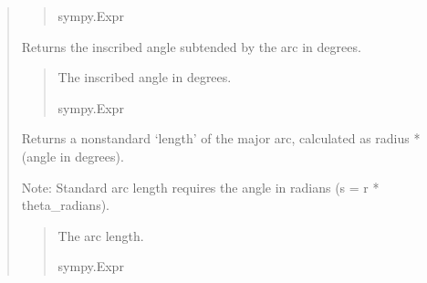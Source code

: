 \documentclass[letterpaper,10pt,english]{sphinxmanual}
\begin{document}
\begin{quote}
\begin{fulllineitems}
\begin{fulllineitems}
\begin{quote}
\begin{description}
\sphinxAtStartPar
sympy.Expr

\end{description}\end{quote}

\end{fulllineitems}


\begin{fulllineitems}
\label{\detokenize{pygeox:pygeox.basic_objects.MajorArc.inscribed_angle}}
\pysigstartsignatures
\pysigline
{}
\pysigstopsignatures
\sphinxAtStartPar
Returns the inscribed angle subtended by the arc in degrees.
\begin{quote}\begin{description}
\sphinxAtStartPar
The inscribed angle in degrees.

\sphinxAtStartPar
sympy.Expr

\end{description}\end{quote}

\end{fulllineitems}


\begin{fulllineitems}
\label{\detokenize{pygeox:pygeox.basic_objects.MajorArc.length}}
\pysigstartsignatures
\pysigline
{}
\pysigstopsignatures
\sphinxAtStartPar
Returns a non\sphinxhyphen{}standard ‘length’ of the major arc, calculated as radius * (angle in degrees).

\sphinxAtStartPar
Note: Standard arc length requires the angle in radians (s = r * theta\_radians).
\begin{quote}\begin{description}
\sphinxAtStartPar
The arc length.

\sphinxAtStartPar
sympy.Expr

\end{description}\end{quote}


\end{fulllineitems}
\end{fulllineitems}
\end{quote}
\end{document}
